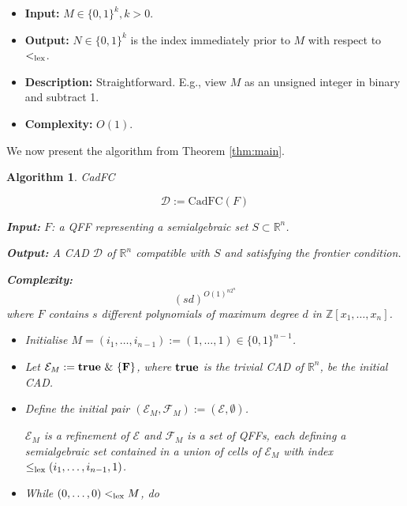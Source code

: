 \documentclass[
]{book}
\providecommand{\tightlist}{%
  \setlength{\itemsep}{0pt}\setlength{\parskip}{0pt}}
\newtheorem{algorithm}{Algorithm}
\theoremstyle{definition}
\theoremstyle{definition}
\theoremstyle{definition}
\theoremstyle{definition}
\theoremstyle{remark}
\begin{document}
\begin{itemize}
  \begin{itemize}
  \tightlist
  \item
    \textbf{Input:} \(M \in \{0,1\}^k, k > 0\).
  \item
    \textbf{Output:} \(N \in \{0,1\}^k\) is the index immediately prior to \(M\) with respect to \(<_{\rm{lex}}\).
  \item
    \textbf{Description:} Straightforward. E.g., view \(M\) as an unsigned integer in binary and subtract 1.
  \item
    \textbf{Complexity:} \(O(1)\).
  \end{itemize}
\end{itemize}

We now present the algorithm from Theorem \ref{thm:main}.

\hypertarget{algorithm-main}{}
\begin{algorithm}CadFC

\[
{\mathcal D} := \mathrm{CadFC}(F)
\]

\textbf{Input:}
\(F\): a QFF representing a semialgebraic set \(S \subset \mathbb{R}^n\).

\textbf{Output:}
A CAD \(\mathcal D\) of \(\mathbb{R}^n\) compatible with \(S\) and satisfying the frontier condition.

\textbf{Complexity:}
\[(sd)^{O(1)^{n2^n}}\]
where \(F\) contains \(s\) different polynomials of maximum degree \(d\) in \(\mathbb{Z}[x_1,\ldots,x_n]\).

\begin{itemize}
\item
  Initialise \(M = (i_1,\ldots,i_{n-1}) := (1,\ldots,1) \in \{0,1\}^{n-1}\).
\item
  Let \(\mathcal{E}_M := \bf{true} \ \&\ \{ F \}\), where \(\bf{true}\) is the trivial CAD of \(\mathbb{R}^n\), be the initial CAD.
\item
  Define the initial pair
  \(({\mathcal E}_M, \mathcal{F}_M):=({\mathcal E}, \emptyset)\).

  \(\mathcal{E}_M\) is a refinement of \(\mathcal{E}\) and \(\mathcal{F}_M\) is a set of QFFs, each defining a semialgebraic set contained in a union of cells of \(\mathcal{E}_M\) with index \(\le_{\rm{lex}}(i_1,\ldots,i_{n-1},1)\).
\item
  While \((0,\ldots,0) <_{\rm{lex}}M\), do


\end{itemize}
\end{algorithm}
\end{document}
